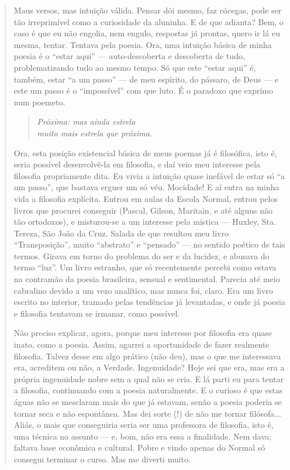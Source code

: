 \documentclass[12pt]{extarticle}
\begin{document}
\begin{enumerate}
\begin{quote}
Maus versos, mas intuição válida. Pensar dói mesmo, faz cócegas, pode
ser tão irreprimível como a curiosidade da aluninha. E de que adianta?
Bem, o caso é que eu não engolia, nem engulo, respostas já prontas,
quero ir lá eu mesma, tentar. Tentava pela poesia. Ora, uma intuição
básica de minha poesia é o ``estar aqui'' --- auto-descoberta e
descoberta de tudo, problematizando tudo ao mesmo tempo. Só que este
``estar aqui'' é, também, estar ``a um passo'' --- de meu espírito, do
pássaro, de Deus --- e este um passo é o ``impossível'' com que luto. É
o paradoxo que exprimo num poemeto.

\begin{verse}
\hspace{3cm}\emph{Próxima: mas ainda estrela}\\
\hspace{3cm}\emph{muito mais estrela que próxima.}
\end{verse}

Ora, esta posição existencial básica de meus poemas já é filosófica,
isto é, seria possível desenvolvê-la em filosofia, e daí veio meu
interesse pela filosofia propriamente dita. Eu vivia a intuição quase
inefável de estar só ``a um passo'', que bastava erguer um só véu.
Mocidade! E aí entra na minha vida a filosofia explícita. Entrou em
aulas da Escola Normal, entrou pelos livros que procurei conseguir
(Pascal, Gilson, Maritain, e até alguns não tão ortodoxos), e
misturou-se a um interesse pela mística --- Huxley, Sta. Tereza, São
João da Cruz. Salada de que resultou meu livro ``Transposição'', muito
``abstrato'' e ``pensado'' --- no sentido poético de tais termos. Girava
em torno do problema do ser e da lucidez, e abusava do termo ``luz''. Um
livro estranho, que só recentemente percebi como estava na contramão da
poesia brasileira, sensual e sentimental. Parecia até meio cabralino
devido a um vezo analítico, mas nunca foi, claro. Era um livro escrito
no interior, tramado pelas tendências já levantadas, e onde já poesia e
filosofia tentavam se irmanar, como possível.

Não preciso explicar, agora, porque meu interesse por filosofia era
quase inato, como a poesia. Assim, agarrei a oportunidade de fazer
realmente filosofia. Talvez desse em algo prático (não deu), mas o que
me interessava era, acreditem ou não, a Verdade. Ingenuidade? Hoje sei
que era, mas era a própria ingenuidade nobre sem a qual não se cria. E
lá parti eu para tentar a filosofia, continuando com a poesia
naturalmente. E o curioso é que estas águas não se mesclaram mais do que
já estavam, senão a poesia poderia se tornar seca e não espontânea. Mas
dei sorte (!) de não me tornar filósofa... Aliás, o mais que conseguiria
seria ser uma professora de filosofia, isto é, uma técnica no assunto
--- e, bom, não era essa a finalidade. Nem dava; faltava base econômica
e cultural. Pobre e vindo apenas do Normal só consegui terminar o curso.
Mas me diverti muito.
\end{quote}


\end{enumerate}
\end{document}
